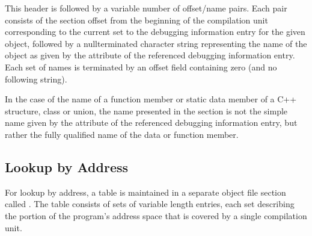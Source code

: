 This header is followed by a variable number of offset/name
pairs. Each pair consists of the section offset from the
beginning of the compilation unit corresponding to the current
set to the debugging information entry for the given object,
followed by a null\dash terminated character string representing
the name of the object as given by the  attribute
of the referenced debugging information entry. Each set of
names is terminated by an offset field containing zero (and
no following string).


In the case of the name of a function member or static data
member of a C++ structure, class or union, the name presented
in the 
section is not the simple name given
by the  attribute of the referenced debugging
information entry, but rather the fully qualified name of
the data or function member.

\subsection{Lookup by Address}

For 
lookup by address, a table is maintained in a separate
object file section called 
. The table consists
of sets of variable length entries, each set describing the
portion of the program\textquoteright s address space that is covered by
a single compilation unit.

